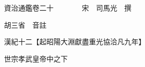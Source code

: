 










 


 
 


 

  
  
  
  
  





  
  
  
  
  
 
  

  

  
  
  



  

 
 

  
   




  

  
  


  　　資治通鑑卷二十　　　　宋　司馬光　撰

　　胡三省　音註

　　漢紀十二【起昭陽大淵獻盡重光協洽凡九年】

　　世宗孝武皇帝中之下

